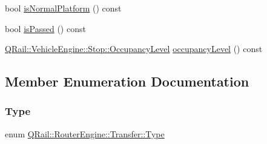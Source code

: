 \begin{DoxyCompactItemize}
\item 
bool \mbox{\hyperlink{classQRail_1_1RouterEngine_1_1Transfer_ac7d6d4da7413183dffa0ebf1103f0df7}{is\+Normal\+Platform}} () const
\item 
bool \mbox{\hyperlink{classQRail_1_1RouterEngine_1_1Transfer_a73fe1fc5e15b7ea46dd8fc736c3245c6}{is\+Passed}} () const
\item 
\mbox{\hyperlink{classQRail_1_1VehicleEngine_1_1Stop_ad967ed81b19762bd582c1af07354a6d4}{Q\+Rail\+::\+Vehicle\+Engine\+::\+Stop\+::\+Occupancy\+Level}} \mbox{\hyperlink{classQRail_1_1RouterEngine_1_1Transfer_a7d2b205630953a366947eacffff3f824}{occupancy\+Level}} () const
\end{DoxyCompactItemize}


\subsection{Member Enumeration Documentation}
\mbox{\label{classQRail_1_1RouterEngine_1_1Transfer_a5a0b372acbdfb9381fb937bf163edfa6}} 
\subsubsection{\texorpdfstring{Type}{Type}}
{\footnotesize\ttfamily enum \mbox{\hyperlink{classQRail_1_1RouterEngine_1_1Transfer_a5a0b372acbdfb9381fb937bf163edfa6}{Q\+Rail\+::\+Router\+Engine\+::\+Transfer\+::\+Type}}\hspace{0.3cm}{\ttfamily [strong]}}

